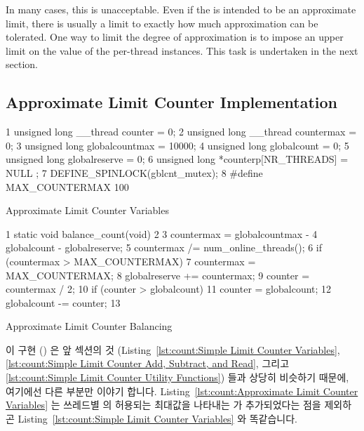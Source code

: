 In many cases, this is unacceptable.
Even if the  is intended to be an approximate limit,
there is usually a limit to exactly how much approximation can be tolerated.
One way to limit the degree of approximation is to impose an upper limit
on the value of the per-thread  instances.
This task is undertaken in the next section.
\fi

\subsection{Approximate Limit Counter Implementation}
\label{sec:count:Approximate Limit Counter Implementation}

\begin{listing}[tbp]
{ \scriptsize
\begin{verbbox}
  1 unsigned long __thread counter = 0;
  2 unsigned long __thread countermax = 0;
  3 unsigned long globalcountmax = 10000;
  4 unsigned long globalcount = 0;
  5 unsigned long globalreserve = 0;
  6 unsigned long *counterp[NR_THREADS] = { NULL };
  7 DEFINE_SPINLOCK(gblcnt_mutex);
  8 #define MAX_COUNTERMAX 100
\end{verbbox}
}
\centering
\theverbbox
\caption{Approximate Limit Counter Variables}
\label{lst:count:Approximate Limit Counter Variables}
\end{listing}

\begin{listing}[tbp]
{ \scriptsize
\begin{verbbox}
  1 static void balance_count(void)
  2 {
  3   countermax = globalcountmax -
  4                globalcount - globalreserve;
  5   countermax /= num_online_threads();
  6   if (countermax > MAX_COUNTERMAX)
  7     countermax = MAX_COUNTERMAX;
  8   globalreserve += countermax;
  9   counter = countermax / 2;
 10   if (counter > globalcount)
 11     counter = globalcount;
 12   globalcount -= counter;
 13 }
\end{verbbox}
}
\centering
\theverbbox
\caption{Approximate Limit Counter Balancing}
\label{lst:count:Approximate Limit Counter Balancing}
\end{listing}

이 구현 () 은 앞 섹션의 것
(Listing~\ref{lst:count:Simple Limit Counter Variables},
\ref{lst:count:Simple Limit Counter Add, Subtract, and Read}, 그리고
\ref{lst:count:Simple Limit Counter Utility Functions}) 들과 상당히 비슷하기
때문에, 여기에선 다른 부분만 이야기 합니다.
Listing~\ref{lst:count:Approximate Limit Counter Variables} 는 쓰레드별
 의 허용되는 최대값을 나타내는  가
추가되었다는 점을 제외하곤
Listing~\ref{lst:count:Simple Limit Counter Variables} 와 똑같습니다.

